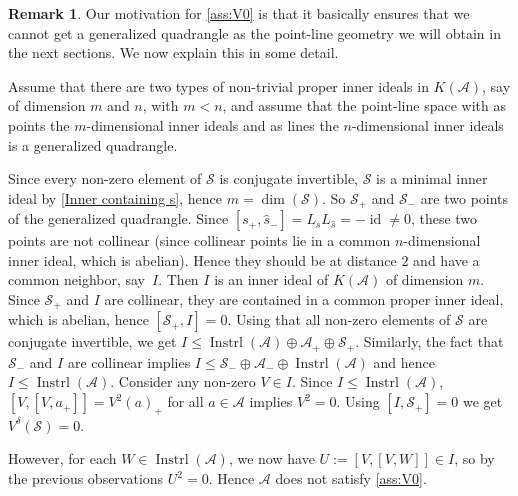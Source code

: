 \documentclass[oneside,a4paper]{amsart} %
\theoremstyle{definition}
\newtheorem{remark}[theorem]{Remark}
\DeclareMathOperator{\Inst}{Instrl}
\DeclareMathOperator{\id}{id}
\newcommand{\A}{\mathcal{A}}
\renewcommand{\SS}{\mathcal{S}}
\numberwithin{equation}{section}
\begin{document}
\begin{remark}
	Our motivation for \cref{ass:V0} is that it basically ensures that we cannot get a generalized quadrangle as the point-line geometry we will obtain in the next sections.
	We now explain this in some detail.
	
	Assume that there are two types of non-trivial proper inner ideals in $K(\A)$, say of dimension $m$ and $n$, with $m<n$, and assume that the point-line space with as points the $m$-dimensional inner ideals and as lines the $n$-dimensional inner ideals is a generalized quadrangle. 
	
	Since every non-zero element of $\SS$ is conjugate invertible, $\SS$ is a minimal inner ideal by \cref{Inner containing s}, hence $m=\dim (\SS)$.
	So $\SS_+$ and $\SS_-$ are two points of the generalized quadrangle. 
	Since $[s_+,\hat s_-]=L_sL_{\hat s}=-\id\neq 0$, these two points are not collinear (since collinear points lie in a common $n$-dimensional inner ideal, which is abelian). 
	Hence they should be at distance $2$ and have a common neighbor, say~$I$.
	Then $I$ is an inner ideal of $K(\A)$ of dimension $m$.
	Since $\SS_+$ and $I$ are collinear, they are contained in a common proper inner ideal, which is abelian, hence $[\SS_+,I]=0$.
	Using that all non-zero elements of $\SS$ are conjugate invertible, we get $I\leq \Inst (\A)\oplus \A_+\oplus \SS_+$.
	Similarly, the fact that $\SS_-$ and $I$ are collinear implies $I\leq \SS_-\oplus \A_-\oplus \Inst (\A)$ and hence $I\leq \Inst (\A)$.
	Consider any non-zero $V\in I$.
	Since $I\leq \Inst (\A)$, $[V,[V,a_+]]=V^2(a)_+$ for all $a \in \A$ implies $V^2=0$. 
	Using $[I,\SS_+]=0$ we get $V^\delta(\SS)=0$.
	
	However, for each $W\in\Inst (\A)$, we now have $U:=[V,[V,W]]\in I$, so by the previous observations $U^2=0$.
	Hence $\A$ does not satisfy \cref{ass:V0}.
\end{remark}
\end{document}
